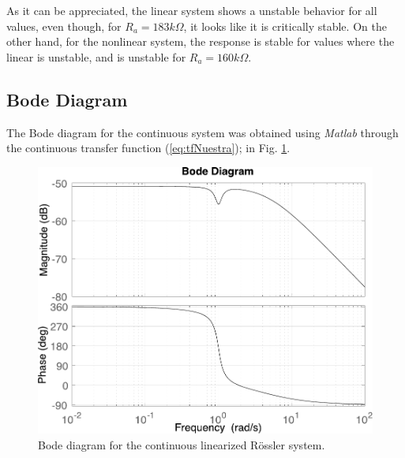 	As it can be appreciated, the linear system shows a unstable behavior for all values, even though, for $R_a=183k\Omega$, it looks like it is critically stable. On the other hand, for the nonlinear system, the response is stable for values where the linear is unstable, and is unstable for $R_a=160k\Omega$.
	


\subsection{Bode Diagram}
The Bode diagram for the continuous system was obtained using \textit{Matlab} through the continuous transfer function (\ref{eq:tfNuestra}); in Fig. \ref{fig:contBode}.
\begin{figure}[ht]
    \centering
    \includegraphics[scale=0.5]{figs/bodeDiagram.pdf}
    \caption{Bode diagram for the continuous linearized Rössler system.}
    \label{fig:contBode}
\end{figure}

